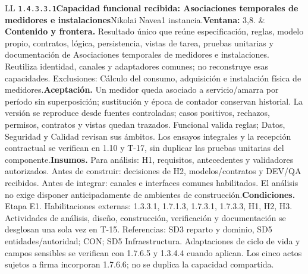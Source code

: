 \begin{longtable}{L{\tabcolsep\relax}L{\tabcolsep\relax}}
\texttt{1.\allowbreak{}4.\allowbreak{}3.\allowbreak{}3.\allowbreak{}1}\newline{}\textbf{Capacidad funcional recibida: Asociaciones temporales de medidores e instalaciones}\newline{}Nikolai Navea\newline{}1 instancia.\newline{}\textbf{Ventana:} 3,8. & \textbf{Contenido y frontera.} Resultado único que reúne especificación, reglas, modelo propio, contratos, lógica, persistencia, vistas de tarea, pruebas unitarias y documentación de Asociaciones temporales de medidores e instalaciones. Reutiliza identidad, canales y adaptadores comunes; no reconstruye esas capacidades. Exclusiones: Cálculo del consumo, adquisición e instalación física de medidores.\newline{}\textbf{Aceptación.} Un medidor queda asociado a servicio/amarra por período sin superposición; sustitución y época de contador conservan historial. La versión se reproduce desde fuentes controladas; casos positivos, rechazos, permisos, contratos y vistas quedan trazados. Funcional valida reglas; Datos, Seguridad y Calidad revisan sus ámbitos. Los ensayos integrales y la recepción contractual se verifican en 1.10 y T-17, sin duplicar las pruebas unitarias del componente.\newline{}\textbf{Insumos.} Para análisis: H1, requisitos, antecedentes y validadores autorizados. Antes de construir: decisiones de H2, modelos/contratos y DEV/QA recibidos. Antes de integrar: canales e interfaces comunes habilitados. El análisis no exige disponer anticipadamente de ambientes de construcción.\newline{}\textbf{Condiciones.} Etapa E1. Habilitaciones externas: 1.3.3.1, 1.7.1.3, 1.7.3.1, 1.7.3.3, H1, H2, H3. Actividades de análisis, diseño, construcción, verificación y documentación se desglosan una sola vez en T-15. Referencias: SD3 reparto y dominio, SD5 entidades/autoridad; CON; SD5 Infraestructura. Adaptaciones de ciclo de vida y campos sensibles se verifican con 1.7.6.5 y 1.3.4.4 cuando aplican. Los cinco actos sujetos a firma incorporan 1.7.6.6; no se duplica la capacidad compartida.\\\hline
\end{longtable}\endgroup
\begingroup\setlength{\tabcolsep}{3pt}
